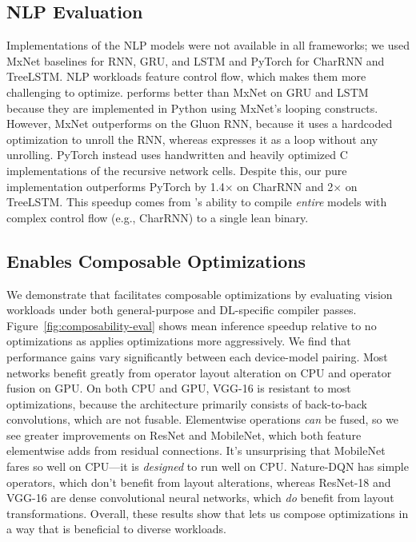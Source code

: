 \subsection*{NLP Evaluation}
Implementations of the NLP models were not available in all frameworks;
  we used MxNet baselines for RNN, GRU, and LSTM and PyTorch for CharRNN and TreeLSTM.
NLP workloads feature control flow,
  which makes them more challenging to optimize.
\relay performs better than MxNet on GRU and LSTM
  because they are implemented in Python using
  MxNet's looping constructs.
However,
  MxNet outperforms \relay on the Gluon RNN,
  because it uses a hardcoded optimization to unroll the RNN,
  whereas \relay expresses it as a loop without any unrolling.
PyTorch instead uses handwritten and heavily optimized
  C implementations of the recursive network cells.
Despite this,
  our pure \relay implementation outperforms PyTorch by 1.4$\times$ on
  CharRNN and 2$\times$ on TreeLSTM.
This speedup comes from \relay's ability to compile \textit{entire}
  models with complex control flow (e.g., CharRNN) to a single lean binary.

\subsection{\relay Enables Composable Optimizations}
\label{sec:eval_opts}

We demonstrate that \relay facilitates composable optimizations
  by evaluating vision workloads under both general-purpose and DL-specific compiler passes.
Figure~\ref{fig:composability-eval} shows mean inference speedup relative to
  no optimizations as \relay applies optimizations more aggressively.
We find that performance gains vary significantly between each device-model pairing.
Most networks benefit greatly from operator layout alteration on CPU and operator fusion on GPU.
On both CPU and GPU,
  VGG-16 is resistant to most optimizations,
  because the architecture primarily consists of back-to-back convolutions,
  which are not fusable.
Elementwise operations \textit{can} be fused,
  so we see greater improvements on ResNet and MobileNet,
  which both feature elementwise adds from residual connections.
It's unsurprising that MobileNet fares so well on CPU---it is \textit{designed} to run well on CPU.
Nature-DQN has simple operators,
  which don't benefit from layout alterations,
  whereas ResNet-18 and VGG-16 are dense convolutional neural networks,
  which \textit{do} benefit from layout transformations.
Overall, these results show that \relay lets us compose optimizations
  in a way that is beneficial to diverse workloads.

